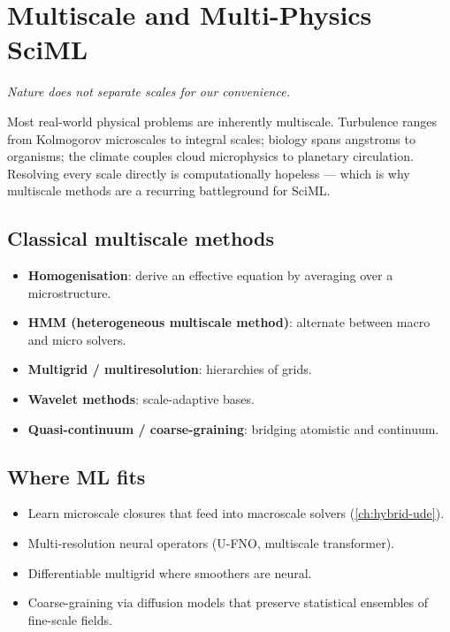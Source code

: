 \chapter{Multiscale and Multi-Physics SciML}
\label{ch:multiscale}

\epigraph{\itshape Nature does not separate scales for our convenience.}{}

Most real-world physical problems are inherently multiscale.
Turbulence ranges from Kolmogorov microscales to integral scales;
biology spans angstroms to organisms; the climate couples cloud
microphysics to planetary circulation. Resolving every scale directly
is computationally hopeless --- which is why multiscale methods are a
recurring battleground for SciML.

\section{Classical multiscale methods}
\begin{itemize}
\item \textbf{Homogenisation}: derive an effective equation by averaging
over a microstructure.
\item \textbf{HMM (heterogeneous multiscale method)}: alternate between
macro and micro solvers.
\item \textbf{Multigrid / multiresolution}: hierarchies of grids.
\item \textbf{Wavelet methods}: scale-adaptive bases.
\item \textbf{Quasi-continuum / coarse-graining}: bridging atomistic and
continuum.
\end{itemize}

\section{Where ML fits}
\begin{itemize}
\item Learn microscale closures that feed into macroscale solvers
(\cref{ch:hybrid-ude}).
\item Multi-resolution neural operators (U-FNO, multiscale
transformer).
\item Differentiable multigrid where smoothers are neural.
\item Coarse-graining via diffusion models that preserve statistical
ensembles of fine-scale fields.
\end{itemize}

